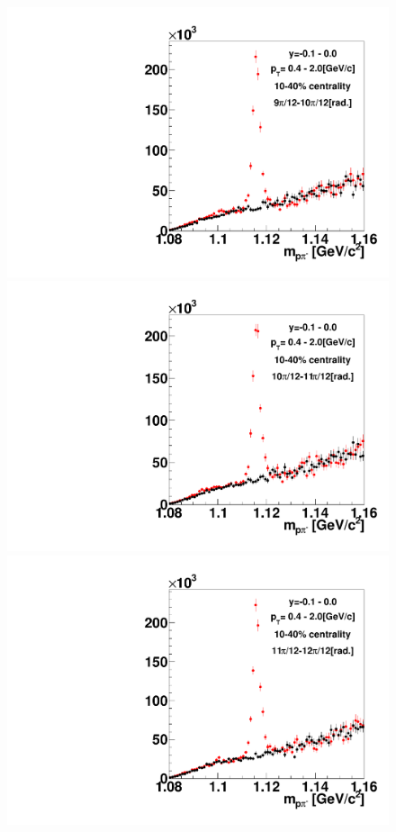 \begin{figure}[h]
\includegraphics[width=0.14\linewidth]{chapterX/fig/ld_v1_sig/kf_ptslice0_cent1_ld_flow_phi10_rap5_check.pdf}
\includegraphics[width=0.14\linewidth]{chapterX/fig/ld_v1_sig/kf_ptslice0_cent1_ld_flow_phi11_rap5_check.pdf}
\includegraphics[width=0.14\linewidth]{chapterX/fig/ld_v1_sig/kf_ptslice0_cent1_ld_flow_phi12_rap5_check.pdf}


\end{figure}
